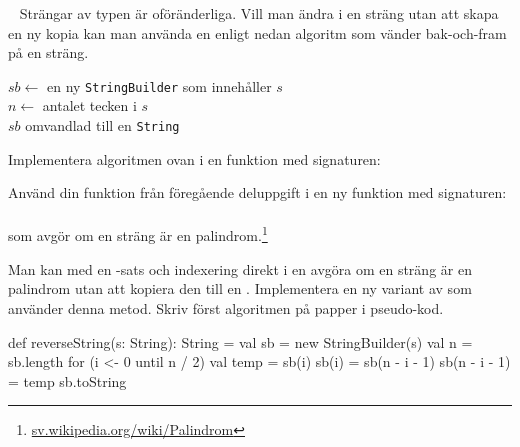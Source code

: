 \QUESTEND









\QUESTBEGIN

\Task  \what~  Strängar av typen  är oföränderliga. Vill man ändra i en sträng utan att skapa en ny kopia kan man använda en  enligt nedan algoritm som vänder bak-och-fram på en sträng.

\begin{algorithm}[H]

 $sb \leftarrow$ en ny \texttt{StringBuilder} som innehåller $s$ \\
 $n \leftarrow$ antalet tecken i $s$\\
 \Return $sb$ omvandlad till en \texttt{String}
\end{algorithm}

\Subtask Implementera algoritmen ovan i en funktion med signaturen: \\

\Subtask Använd din funktion  från föregående deluppgift i en ny funktion med signaturen:\\
  \\ som avgör om en sträng är en palindrom.\footnote{\href{https://sv.wikipedia.org/wiki/Palindrom}{sv.wikipedia.org/wiki/Palindrom}}

\Subtask\Pen Man kan med en -sats och indexering direkt i en  avgöra om en sträng är en palindrom utan att kopiera den till en . Implementera en ny variant av  som använder denna metod. Skriv först algoritmen på papper i pseudo-kod.

\SOLUTION


\TaskSolved \what


\SubtaskSolved  \begin{Code}
def reverseString(s: String): String = {
  val sb = new StringBuilder(s)
  val n = sb.length
  for (i <- 0 until n / 2) {
    val temp = sb(i)
    sb(i) = sb(n - i - 1)
    sb(n - i - 1) = temp
  }
  sb.toString
}
\end{Code}

